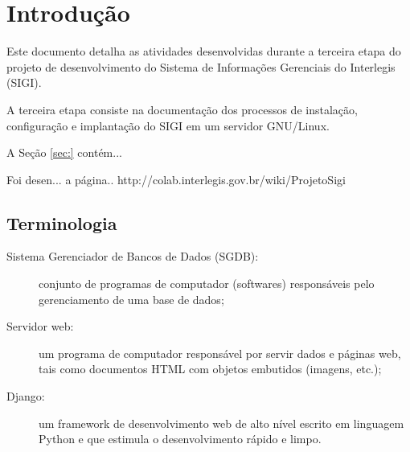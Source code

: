 %
%

\section{Introdução}

Este documento detalha as atividades desenvolvidas durante a terceira
etapa do projeto de desenvolvimento do Sistema de Informações
Gerenciais do Interlegis (SIGI).

A terceira etapa consiste na documentação dos processos de instalação,
configuração e implantação do SIGI em um servidor GNU/Linux.

A Seção \ref{sec:} contém...

Foi desen... a página.. http://colab.interlegis.gov.br/wiki/ProjetoSigi

\subsection{Terminologia}
\begin{description}
\item[Sistema Gerenciador de Bancos de Dados (SGDB):] conjunto de
  programas de computador (softwares) responsáveis pelo gerenciamento
  de uma base de dados;
\item[Servidor web:] um programa de computador responsável por servir
  dados e páginas web, tais como documentos HTML com objetos embutidos
  (imagens, etc.);
\item[Django:] um framework de desenvolvimento web de alto nível
  escrito em linguagem Python e que estimula o desenvolvimento rápido
  e limpo.
\end{description}

%
%
